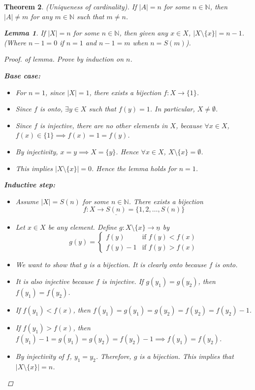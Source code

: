 \documentclass[10pt]{article}
\newcommand{\N}{\mathbb{N}}
\newcommand{\abs}[1]{\left| #1 \right|}
\newtheorem{theorem}{Theorem}[section]
\newtheorem{lemma}[theorem]{Lemma}
\theoremstyle{definition}
\theoremstyle{remark}
\begin{document}
\begin{theorem}
    (Uniqueness of cardinality).
    If $\abs{A} = n$ for some $n \in \N$, then $\abs{A} \neq m$ for any $m \in \N$ such that $m \neq n$.
    \begin{lemma}
        If $\abs{X} = n$ for some $n \in \N$, then given any $x \in X$, $\abs{X \setminus \{x\}} = n - 1$.
        (Where $n-1 = 0$ if $n = 1$ and $n-1 = m$ when $n = S(m)$).
    \end{lemma}

    \begin{proof}
        of lemma. Prove by induction on $n$.

        \textbf{Base case:}
        \begin{itemize}
            \item 
                For $n =1$, since $\abs{X} = 1$, there exists a bijection $f: X \to \{1\}$.
            \item 
        Since $f$ is onto, $\exists y \in X$ such that $f(y) = 1$. In particular, $X \neq \emptyset$.
        \item
        Since $f$ is injective, there are no other elements in $X$, because
        $\forall x \in X$, $f(x) \in \{1\} \implies f(x) = 1 = f(y)$.
    \item 
        By injectivity, $x = y \implies X = \{y\}$. Hence $\forall x \in X$, $X \setminus \{x\} = \emptyset$.
        \item
        This implies $\abs{X \setminus \{x\}} = 0$. Hence the lemma holds for $n = 1$.
        \end{itemize}
        
        \textbf{Inductive step:}
        \begin{itemize}
            \item 
        Assume $\abs{X} = S(n)$ for some $n \in \N$. There exists a bijection
        $$f: X \to \underline{S(n)} = \{1, 2, \ldots, S(n)\}$$
            \item 
            Let $x \in X$ be any element. Define $g: X \setminus \{x\} \to \underline{n}$ by
        $$g(y) = \begin{cases} f(y) & \text{if } f(y) < f(x) \\ f(y) - 1 & \text{if } f(y) > f(x) \end{cases}$$
            \item
        We want to show that $g$ is a bijection. It is clearly onto because $f$ is onto.
            \item 
            It is also injective because $f$ is injective. If $g(y_1) = g(y_2)$, then $f(y_1) = f(y_2)$.
            \item
        If $f(y_1) < f(x)$, then $f(y_1) = g(y_1) = g(y_2) = f(y_2) = f(y_2) - 1$.
        \item
        If $f(y_1) > f(x)$, then $f(y_1) - 1 = g(y_1) = g(y_2) = f(y_2) - 1 \implies f(y_1) = f(y_2)$.
        \item
        By injectivity of $f$, $y_1 = y_2$. Therefore, $g$ is a bijection.
        This implies that $\abs{X \setminus \{x\}} = n$.
        \end{itemize}
    \end{proof}


\end{theorem}
\end{document}
